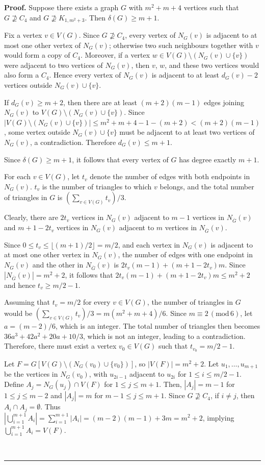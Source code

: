 \documentclass[12]{article}
\newenvironment{proof}[1][Proof]{\textbf{#1.} }{\ \rule{0.5em}{0.5em}}
\begin{document}
\begin{proof}
Suppose there exists a graph $G$ with $m^2+m+4$ vertices such that
$G\nsupseteq C_4$ and $G\nsupseteq K_{1,m^2+3}$. Then $\delta(G)\ge m+1$.

Fix a vertex $v\in V(G)$. Since $G\nsupseteq C_4$, every vertex of $N_G(v)$ is adjacent
to at most one other vertex of $N_G(v)$; otherwise two such neighbours together with $v$
would form a copy of $C_4$. Moreover, if a vertex
$w\in V(G)\setminus (N_G(v)\cup\{v\})$ were adjacent to two vertices of $N_G(v)$, then
$v$, $w$, and these two vertices would also form a $C_4$. Hence every vertex of
$N_G(v)$ is adjacent to at least $d_G(v)-2$ vertices outside $N_G(v)\cup\{v\}$.

If $d_G(v)\ge m+2$, then there are at least
$(m+2)(m-1)$ edges joining $N_G(v)$ to
$V(G)\setminus (N_G(v)\cup\{v\})$. Since
$|V(G)\setminus (N_G(v)\cup\{v\})|
\le m^2+m+4-1-(m+2)<(m+2)(m-1)$,
some vertex outside $N_G(v)\cup\{v\}$ must be adjacent to at least two vertices of
$N_G(v)$, a contradiction. Therefore $d_G(v)\le m+1$.

Since $\delta(G)\ge m+1$, it follows that every vertex of $G$ has degree exactly $m+1$.

For each $v\in V(G)$, let $t_v$ denote the number of edges with both endpoints in $N_G(v)$. $t_v$ is the number of triangles to which $v$ belongs, and the total number of triangles in $G$ is $(\sum_{v\in V(G)}t_v)/3$.

Clearly, there are $2t_v$ vertices in $N_G(v)$ adjacent to $m-1$ vertices in $N_{\overline{G}}(v)$ and $m+1-2t_v$ vertices in $N_G(v)$ adjacent to $m$ vertices in $N_{\overline{G}}(v)$.

Since $0\le t_v\le\lfloor (m+1)/2\rfloor=m/2$, and each vertex in $N_G(v)$ is adjacent to at most one other vertex in $N_G(v)$,
the number of edges with one endpoint in $N_G(v)$ and the other in $N_{\overline{G}}(v)$ is $2t_v(m-1)+(m+1-2t_v)m$. Since $|N_{\overline{G}}(v)|=m^2+2$, it follows that $2t_v(m-1)+(m+1-2t_v)m\le m^2+2$ and hence $t_v\ge m/2-1$.

Assuming that $t_v=m/2$ for every $v\in V(G)$,  the number of triangles in $G$ would be $\left(\sum_{v\in V(G)}t_v\right)\!/3=m(m^2+m+4)/6.$ Since $m\equiv 2 \,(\text{mod}\, 6)$, let $a=(m-2)/6$, which is an integer. The total number of triangles then becomes $36a^3+42a^2+20a+10/3$, which is not an integer, leading to a contradiction. Therefore, there must exist a vertex $v_0\in V(G)$ such that $t_{v_0}=m/2-1$.

Let $F=G[V(G)\setminus(N_G(v_0)\cup\{v_0\})]$, so $|V(F)|=m^2+2$. Let $u_1,\ldots,u_{m+1}$ be the vertices in $N_G(v_0)$, with $u_{2i-1}$ adjacent to $u_{2i}$ for $1\le i\le m/2-1$. Define $A_j=N_G(u_j)\cap V(F)$ for $1\le j\le m+1$. Then, $|A_j|=m-1$ for $1\le j\le m-2$ and $|A_j|=m$ for $m-1\le j\le m+1$. Since $G\nsupseteq C_4$, if $i\ne j$, then $A_i\cap A_j=\emptyset$. Thus $|\bigcup_{i=1}^{m+1}A_i|=\sum_{i=1}^{m+1}|A_i|=(m-2)(m-1)+3m=m^2+2$, implying $\bigcup_{i=1}^{m+1}A_i=V(F)$.


\end{proof}
\end{document}
